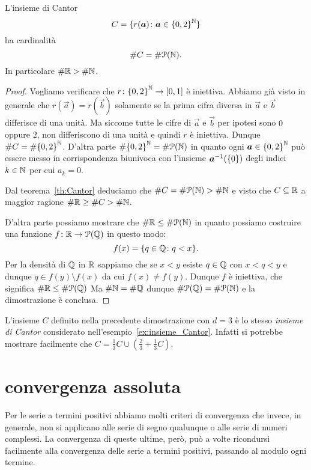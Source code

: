 \begin{theorem}[Cantor]
  \label{th:cantor_secondo}
L'insieme di Cantor
\[
  C = \{r(\boldsymbol a)\colon \boldsymbol a \in {\left\{ 0,2 \right\}}^{\mathbb N}\}
\]
ha cardinalità
\[
\# C = \# \mathcal P({\mathbb N}).
\]
In particolare $\#{\mathbb R} > \#{\mathbb N}$.
\end{theorem}
%
\begin{proof}
Vogliamo verificare che $r\colon {\left\{ 0,2 \right\}}^{\mathbb N} \to \left[0,1\right]$
è iniettiva.
Abbiamo già visto in generale che $r(\vec a) = r(\vec b)$ solamente 
se la prima cifra diversa in $\vec a$ e $\vec b$ differisce di una unità.
Ma siccome tutte le cifre di $\vec a$ e $\vec b$ per ipotesi sono $0$ oppure 
$2$, non differiscono di una unità e quindi $r$ è iniettiva.
Dunque $\# C = \#{\left\{ 0,2 \right\}}^{\mathbb N}$.
D'altra parte $\#{\left\{ 0,2 \right\}}^{\mathbb N} = \#\mathcal P({\mathbb N})$ in quanto 
ogni $\boldsymbol a \in {\left\{ 0,2 \right\}}^{\mathbb N}$ può essere messo in corrispondenza 
biunivoca con l'insieme $\boldsymbol a^{-1}({\left\{ 0 \right\}})$ degli indici $k\in {\mathbb N}$
per cui $a_k=0$.

Dal teorema~\ref{th:Cantor} deduciamo che $\# C = \#\mathcal P({\mathbb N}) > \#{\mathbb N}$ 
e visto che $C\subseteq {\mathbb R}$ a maggior ragione $\# {\mathbb R} \ge \# C >\#{\mathbb N}$.

D'altra parte possiamo mostrare che $\#{\mathbb R} \le \# \mathcal P({\mathbb N})$
in quanto possiamo costruire una funzione $f\colon {\mathbb R} \to \mathcal P({\mathbb Q})$
in questo modo:
\[
f(x) = {\left\{ q\in {\mathbb Q}\colon q<x \right\}}.
\]
Per la densità di ${\mathbb Q}$ in ${\mathbb R}$ sappiamo che se $x<y$ 
esiste $q\in {\mathbb Q}$ con $x<q<y$ e dunque $q\in f(y)\setminus f(x)$ 
da cui $f(x)\neq f(y)$. 
Dunque $f$ è iniettiva, che significa $\#{\mathbb R}\le \# \mathcal P({\mathbb Q})$
Ma $\#{\mathbb N} = \#{\mathbb Q}$ dunque $\#\mathcal P({\mathbb Q}) = \#\mathcal P({\mathbb N})$ 
e la dimostrazione è conclusa.
\end{proof}

L'insieme $C$ definito nella precedente dimostrazione con $d=3$ 
è lo stesso \emph{insieme di Cantor}%
%
% 
considerato nell'esempio~\ref{ex:insieme_Cantor}.
Infatti si potrebbe mostrare facilmente che 
$C=\frac 1 3 C \cup (\frac 2 3 + \frac 1 3 C)$.

\section{convergenza assoluta}

Per le serie a termini positivi abbiamo molti criteri di convergenza
che invece, in generale, non si applicano alle serie di segno qualunque
o alle serie di numeri complessi.
La convergenza di queste ultime, però, può a volte ricondursi
facilmente
alla
convergenza delle serie a termini positivi, passando al modulo
ogni termine.

